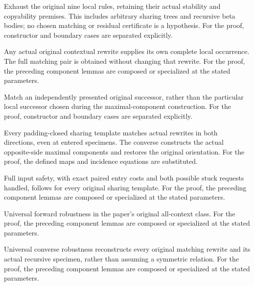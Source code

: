 Exhaust the original nine local rules, retaining their actual stability and copyability premises. This includes arbitrary sharing trees and recursive beta bodies; no chosen matching or residual certificate is a hypothesis.
For the proof, constructor and boundary cases are separated explicitly.
\par{}

Any actual original contextual rewrite supplies its own complete local occurrence. The full matching pair is obtained without changing that rewrite.
For the proof, the preceding component lemmas are composed or specialized at the stated parameters.
\par{}

Match an independently presented original successor, rather than the particular local successor chosen during the maximal-component construction.
For the proof, constructor and boundary cases are separated explicitly.
\par{}

Every padding-closed sharing template matches actual rewrites in both directions, even at entered specimens. The converse constructs the actual opposite-side maximal components and restores the original orientation.
For the proof, the defined maps and incidence equations are substituted.
\par{}

Full input safety, with exact paired entry costs and both possible stuck requests handled, follows for every original sharing template.
For the proof, the preceding component lemmas are composed or specialized at the stated parameters.
\par{}

Universal forward robustness in the paper's original all-context class.
For the proof, the preceding component lemmas are composed or specialized at the stated parameters.
\par{}

Universal converse robustness reconstructs every original matching rewrite and its actual recursive specimen, rather than assuming a symmetric relation.
For the proof, the preceding component lemmas are composed or specialized at the stated parameters.
\par{}

